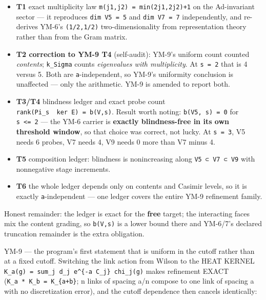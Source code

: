 \begin{itemize}
\tightlist
\item
  \textbf{T1} exact multiplicity law \texttt{m(j1,j2)\ =\ min(2j1,2j2)+1} on the
  Ad-invariant sector --- it reproduces \texttt{dim\ V5\ =\ 5} and \texttt{dim\ V7\ =\ 7}
  independently, and re-derives YM-6's \texttt{(1/2,1/2)} two-dimensionality from
  representation theory rather than from the Gram matrix.
\item
  \textbf{T2 correction to YM-9 T4} (self-audit): YM-9's uniform count counted
  \emph{contents}; \texttt{k\_Sigma} counts \emph{eigenvalues with multiplicity}. At \texttt{s\ =\ 2}
  that is 4 versus 5. Both are \texttt{a}-independent, so YM-9's uniformity
  conclusion is unaffected --- only the arithmetic. YM-9 is amended to
  report both.
\item
  \textbf{T3/T4} blindness ledger and exact probe count
  \texttt{rank(Pi\_s\ \textbar{}\ ker\ E)\ =\ b(V,s)}. Result worth noting: \texttt{b(V5,\ s)\ =\ 0} for
  \texttt{s\ \textless{}=\ 2} --- the YM-6 carrier is \textbf{exactly blindness-free in its own
  threshold window}, so that choice was correct, not lucky. At \texttt{s\ =\ 3},
  V5 needs 6 probes, V7 needs 4, V9 needs 0 more than V7 minus 4.
\item
  \textbf{T5} composition ledger: blindness is nonincreasing along
  \texttt{V5\ ⊂\ V7\ ⊂\ V9} with nonnegative stage increments.
\item
  \textbf{T6} the whole ledger depends only on contents and Casimir levels, so
  it is exactly \texttt{a}-independent --- one ledger covers the entire YM-9
  refinement family.
\end{itemize}

Honest remainder: the ledger is exact for the \textbf{free} target; the
interacting faces mix the content grading, so \texttt{b(V,s)} is a lower bound
there and YM-6/7's declared truncation remainder is the extra obligation.

YM-9 --- the program's first statement that is uniform in the cutoff rather
than at a fixed cutoff. Switching the link action from Wilson to the
HEAT KERNEL \texttt{K\_a(g)\ =\ sum\_j\ d\_j\ e\^{}\{-a\ C\_j\}\ chi\_j(g)} makes refinement
EXACT (\texttt{K\_a\ *\ K\_b\ =\ K\_\{a+b\}}; n links of spacing a/n compose to one link
of spacing a with no discretization error), and the cutoff dependence then
cancels identically:

